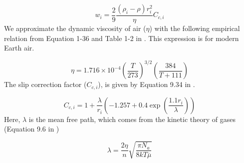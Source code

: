 \begin{equation} \label{eq:stokes_law}
  w_i = \frac{2}{9} \frac{(\rho_i - \rho)r_i^2}{\eta} C_{c,i}
\end{equation}
We approximate the dynamic viscosity of air ($\eta$) with the following empirical relation from Equation 1-36 and Table 1-2 in \cite{White_2006}. This expression is for modern Earth air.

\begin{equation} \label{eq:dynamic_viscosity}
  \eta = 1.716 \times 10^{-4} \left(\frac{T}{273}\right)^{3/2} \left( \frac{384}{T + 111} \right)
\end{equation}
The slip correction factor ($C_{c,i}$), is given by Equation 9.34 in \cite{Seinfeld_2006}.

\begin{equation} \label{eq:slip_correction}
  C_{c,i} = 1 + \frac{\lambda}{r_i}\left( -1.257 + 0.4 \exp \left(\frac{1.1 r_i}{\lambda}\right) \right)
\end{equation}
Here, $\lambda$ is the mean free path, which comes from the kinetic theory of gases (Equation 9.6 in \cite{Seinfeld_2006})

\begin{equation}
  \lambda = \frac{2 \eta}{n} \sqrt{\frac{\pi N_a}{8 k T \overline{\mu}}}
\end{equation}

